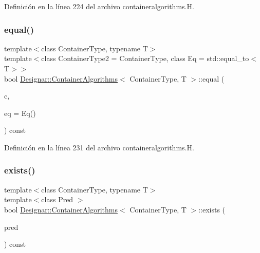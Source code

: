 Definición en la línea 224 del archivo containeralgorithms.\+H.

\mbox{\label{class_designar_1_1_container_algorithms_aece8141a994780c15205aa76d306219b}} 
\subsubsection{\texorpdfstring{equal()}{equal()}\hspace{0.1cm}{\footnotesize\ttfamily [2/2]}}
{\footnotesize\ttfamily template$<$class Container\+Type, typename T$>$ \\
template$<$class Container\+Type2  = Container\+Type, class Eq  = std\+::equal\+\_\+to$<$\+T$>$$>$ \\
bool \hyperlink{class_designar_1_1_container_algorithms}{Designar\+::\+Container\+Algorithms}$<$ Container\+Type, T $>$\+::equal (\begin{DoxyParamCaption}\item[{const Container\+Type2 \&}]{c,  }\item[{Eq \&\&}]{eq = {\ttfamily Eq()} }\end{DoxyParamCaption}) const\hspace{0.3cm}{\ttfamily [inline]}}



Definición en la línea 231 del archivo containeralgorithms.\+H.

\mbox{\label{class_designar_1_1_container_algorithms_a84b04f83c37c70e2b25e943ca0579261}} 
\subsubsection{\texorpdfstring{exists()}{exists()}\hspace{0.1cm}{\footnotesize\ttfamily [1/2]}}
{\footnotesize\ttfamily template$<$class Container\+Type, typename T$>$ \\
template$<$class Pred $>$ \\
bool \hyperlink{class_designar_1_1_container_algorithms}{Designar\+::\+Container\+Algorithms}$<$ Container\+Type, T $>$\+::exists (\begin{DoxyParamCaption}\item[{Pred \&}]{pred }\end{DoxyParamCaption}) const\hspace{0.3cm}{\ttfamily [inline]}}



